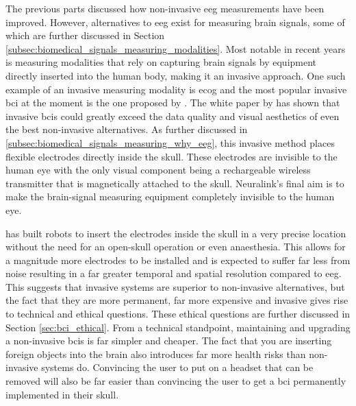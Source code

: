 The previous parts discussed how non-invasive \gls{eeg} measurements have been improved.
However, alternatives to \gls{eeg} exist for measuring brain signals, some of which are further discussed in Section \ref{subsec:biomedical_signals_measuring_modalities}.
Most notable in recent years is measuring modalities that rely on capturing brain signals by equipment directly inserted into the human body, making it an invasive approach.
One such example of an invasive measuring modality is \gls{ecog} and the most popular invasive \gls{bci} at the moment is the one proposed by \citet{neuralink_whitepaper}.
The white paper by \citet{neuralink_whitepaper} has shown that invasive \glspl{bci} could greatly exceed the data quality and visual aesthetics of even the best non-invasive alternatives.
As further discussed in \ref{subsec:biomedical_signals_measuring_why_eeg}, this invasive method places flexible electrodes directly inside the skull.
These electrodes are invisible to the human eye with the only visual component being a rechargeable wireless transmitter that is magnetically attached to the skull.
Neuralink's final aim is to make the brain-signal measuring equipment completely invisible to the human eye.

\citet{neuralink_whitepaper} has built robots to insert the electrodes inside the skull in a very precise location without the need for an open-skull operation or even anaesthesia.
This allows for a magnitude more electrodes to be installed and is expected to suffer far less from noise resulting in a far greater temporal and spatial resolution compared to \gls{eeg}.
This suggests that invasive systems are superior to non-invasive alternatives, but the fact that they are more permanent, far more expensive and invasive gives rise to technical and ethical questions.
These ethical questions are further discussed in Section \ref{sec:bci_ethical}.
From a technical standpoint, maintaining and upgrading a non-invasive \glspl{bci} is far simpler and cheaper.
The fact that you are inserting foreign objects into the brain also introduces far more health risks than non-invasive systems do.
Convincing the user to put on a headset that can be removed will also be far easier than convincing the user to get a \gls{bci} permanently implemented in their skull.

